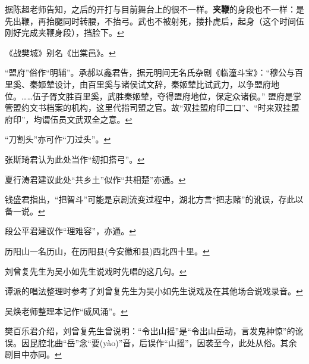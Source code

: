   据陈超老师告知，之后的开打与目前舞台上的很不一样。\textbf{夹鞭}的身段也不一样：是先出鞭，再抬腿同时转腰，不抬弓。武也不被射死，搂扑虎后，起身（这个时间伍刚好完成夹鞭身段），挡脸下。\protect\hyperlink{fnref59}{↩}
\item
  \leavevmode\hypertarget{fn60}{}%
  《战樊城》别名《出棠邑》。\protect\hyperlink{fnref60}{↩}
\item
  \leavevmode\hypertarget{fn61}{}%
  ``盟府''俗作``明辅''。承郝以鑫君告，据元明间无名氏杂剧《临潼斗宝》：``穆公与百里奚、秦姬辇设计，由百里奚与诸侯试文辞，秦姬辇比试武力，以争盟府地位。\ldots{}\ldots{}伍子胥文胜百里奚，武胜秦姬辇，夺得盟府地位，保定众诸侯。''
  盟府是掌管盟约文书档案的机构，这里代指司盟之官。故``双挂盟府印二口''、``时来双挂盟府印''，均谓伍员文武双全之意。\protect\hyperlink{fnref61}{↩}
\item
  \leavevmode\hypertarget{fn62}{}%
  ``刀割头''亦可作``刀过头''。\protect\hyperlink{fnref62}{↩}
\item
  \leavevmode\hypertarget{fn63}{}%
  张斯琦君认为此处当作``纫扣搭弓''。\protect\hyperlink{fnref63}{↩}
\item
  \leavevmode\hypertarget{fn64}{}%
  夏行涛君建议此处``共乡土''似作``共相楚''亦通。\protect\hyperlink{fnref64}{↩}
\item
  \leavevmode\hypertarget{fn65}{}%
  钱盛君指出，``把智斗''可能是京剧流变过程中，湖北方言``把志赌''的讹误，存此以备一说。\protect\hyperlink{fnref65}{↩}
\item
  \leavevmode\hypertarget{fn66}{}%
  段公平君建议作``理难容''，亦通。\protect\hyperlink{fnref66}{↩}
\item
  \leavevmode\hypertarget{fn67}{}%
  历阳山一名历山，在历阳县(今安徽和县)西北四十里。\protect\hyperlink{fnref67}{↩}
\item
  \leavevmode\hypertarget{fn68}{}%
  刘曾复先生为吴小如先生说戏时先唱的这几句。\protect\hyperlink{fnref68}{↩}
\item
  \leavevmode\hypertarget{fn69}{}%
  谭派的唱法整理时参考了刘曾复先生为吴小如先生说戏及在其他场合说戏录音。\protect\hyperlink{fnref69}{↩}
\item
  \leavevmode\hypertarget{fn70}{}%
  吴焕老师整理本记作``威风涌''。\protect\hyperlink{fnref70}{↩}
\item
  \leavevmode\hypertarget{fn71}{}%
  樊百乐君介绍，刘曾复先生曾说明：``令出山摇''是``令出山岳动，言发鬼神惊''的讹误。因昆腔北曲``岳''念``要(yào)''音，后误作``山摇''，因袭至今，此处从俗。其余剧目中亦同。\protect\hyperlink{fnref71}{↩}
\item
  \leavevmode\hypertarget{fn72}{}%
